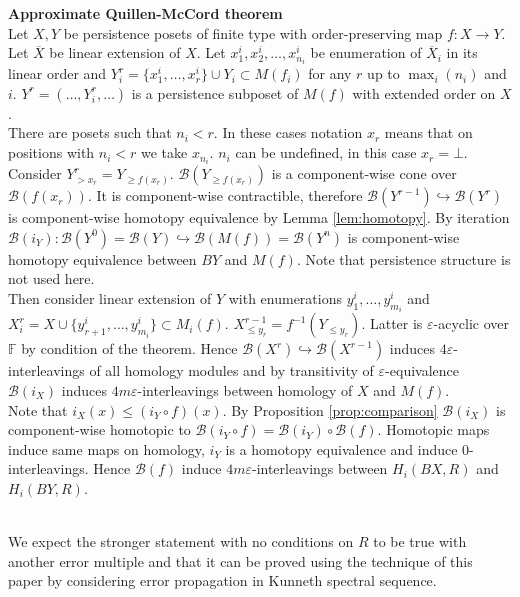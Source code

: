 \begin{pf} \textbf{Approximate Quillen-McCord theorem}\\
  Let $X, Y$ be persistence posets of finite type with order-preserving map $f : X \to Y$.\\

  Let $\overline{X}$ be linear extension of $X$. Let $x^i_1, x^i_2, \ldots, x^i_{n_i}$ be enumeration of $\overline{X}_i$ in its linear order and $Y_i^r = \{x^i_1,\ldots,x^i_r\} \cup Y_i \subset M(f_i)$ for any $r$ up to $\max_{i}(n_i)$ and $i$. $Y^r = (\ldots, Y_i^r, \ldots)$ is a persistence subposet of $M(f)$ with extended order on $X$.\\

  There are posets such that $n_i < r$. In these cases notation $x_r$ means that on positions with $n_i < r$ we take $x_{n_i}$. $n_i$ can be undefined, in this case $x_r = \bot$.\\

  Consider $Y^r_{>x_r} = Y_{\geq f(x_r)}$. $\mathcal{B}(Y_{\geq f(x_r)})$ is a component-wise cone over $\mathcal{B}(f(x_r))$. It is component-wise contractible, therefore $\mathcal{B}(Y^{r-1}) \hookrightarrow \mathcal{B}(Y^{r})$ is component-wise homotopy equivalence by Lemma \ref{lem:homotopy}. By iteration $\mathcal{B}(i_Y) : \mathcal{B}(Y^{0}) = \mathcal{B}(Y) \hookrightarrow \mathcal{B}(M(f)) = \mathcal{B}(Y^n)$ is component-wise homotopy equivalence between $BY$ and $M(f)$. Note that persistence structure is not used here.\\

  Then consider linear extension of $Y$ with enumerations $y^i_1,\ldots,y^i_{m_i}$ and $X_i^r = X \cup \{y^i_{r+1},\ldots,y^i_{m_i}\} \subset M_i(f)$. $X^{r-1}_{\leq y_r} = f^{-1}(Y_{\leqslant y_r})$. Latter is $\varepsilon$-acyclic over $\mathbb{F}$ by condition of the theorem. Hence $\mathcal{B}(X^{r}) \hookrightarrow \mathcal{B}(X^{r-1})$ induces $4\varepsilon$-interleavings of all homology modules and by transitivity of $\varepsilon$-equivalence $\mathcal{B}(i_X)$ induces $4m\varepsilon$-interleavings between homology of $X$ and $M(f)$.\\

  Note that $i_X(x) \leqslant (i_Y \circ f)(x)$. By Proposition \ref{prop:comparison} $\mathcal{B}(i_X)$ is component-wise homotopic to $\mathcal{B}(i_Y \circ f) = \mathcal{B}(i_Y) \circ \mathcal{B}(f)$. Homotopic maps induce same maps on homology, $i_Y$ is a homotopy equivalence and induce $0$-interleavings. Hence $\mathcal{B}(f)$ induce $4m\varepsilon$-interleavings between $H_i(BX,R)$ and $H_i(BY,R)$.
\end{pf}\\

We expect the stronger statement with no conditions on $R$ to be true with another error multiple and that it can be proved using the technique of this paper by considering error propagation in Kunneth spectral sequence.
